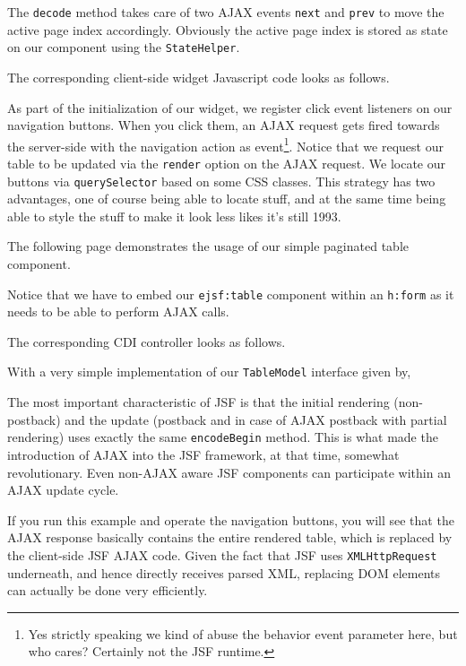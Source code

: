 The \texttt{decode} method takes care of two AJAX events \texttt{next} and \texttt{prev} to move the active page index accordingly.
Obviously the active page index is stored as state on our component using the \texttt{StateHelper}.

The corresponding client-side widget Javascript code looks as follows.

As part of the initialization of our widget, we register click event listeners on our navigation buttons.
When you click them, an AJAX request gets fired towards the server-side with the navigation action as event\footnote{Yes strictly speaking we kind of abuse the behavior event parameter here, but who cares? Certainly not the JSF runtime.}.
Notice that we request our table to be updated via the \texttt{render} option on the AJAX request.
We locate our buttons via \texttt{querySelector} based on some CSS classes.
This strategy has two advantages, one of course being able to locate stuff, and at the same time being able to style the stuff to make it look less likes it's still 1993.

The following page demonstrates the usage of our simple paginated table component.

Notice that we have to embed our \texttt{ejsf:table} component within an \texttt{h:form} as it needs to be able to perform AJAX calls.

The corresponding CDI controller looks as follows.


With a very simple implementation of our \texttt{TableModel} interface given by,


The most important characteristic of JSF is that the initial rendering (non-postback) and the update (postback and in case of AJAX postback with partial rendering) uses exactly the same \texttt{encodeBegin} method.
This is what made the introduction of AJAX into the JSF framework, at that time, somewhat revolutionary.
Even non-AJAX aware JSF components can participate within an AJAX update cycle.

If you run this example and operate the navigation buttons, you will see that the AJAX response basically contains the entire rendered table, which is replaced by the client-side JSF AJAX code.
Given the fact that JSF uses \texttt{XMLHttpRequest} underneath, and hence directly receives parsed XML, replacing DOM elements can actually be done very efficiently.


